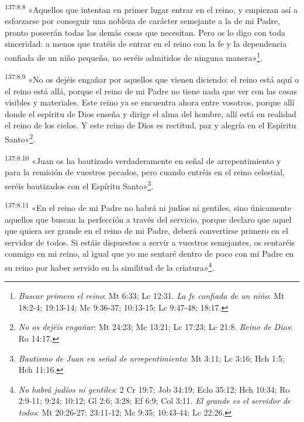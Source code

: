 \par
\textsuperscript{137:8.8} «Aquellos que intentan en primer lugar entrar en el reino, y empiezan así a esforzarse por conseguir una nobleza de carácter semejante a la de mi Padre, pronto poseerán todas las demás cosas que necesitan. Pero os lo digo con toda sinceridad: a menos que tratéis de entrar en el reino con la fe y la dependencia confiada de un niño pequeño, no seréis admitidos de ninguna manera»\footnote{\textit{Buscar primero el reino}: Mt 6:33; Lc 12:31. \textit{La fe confiada de un niño}: Mt 18:2-4; 19:13-14; Mc 9:36-37; 10:13-15; Lc 9:47-48; 18:17.}.

\par
\textsuperscript{137:8.9} «No os dejéis engañar por aquellos que vienen diciendo: el reino está aquí o el reino está allá, porque el reino de mi Padre no tiene nada que ver con las cosas visibles y materiales. Este reino ya se encuentra ahora entre vosotros, porque allí donde el espíritu de Dios enseña y dirige el alma del hombre, allí está en realidad el reino de los cielos. Y este reino de Dios es rectitud, paz y alegría en el Espíritu Santo»\footnote{\textit{No os dejéis engañar}: Mt 24:23; Mc 13:21; Lc 17:23; Lc 21:8. \textit{Reino de Dios}: Ro 14:17.}.

\par
\textsuperscript{137:8.10} «Juan os ha bautizado verdaderamente en señal de arrepentimiento y para la remisión de vuestros pecados, pero cuando entréis en el reino celestial, seréis bautizados con el Espíritu Santo»\footnote{\textit{Bautismo de Juan en señal de arrepentimiento}: Mt 3:11; Lc 3:16; Hch 1:5; Hch 11:16.}.

\par
\textsuperscript{137:8.11} «En el reino de mi Padre no habrá ni judíos ni gentiles, sino únicamente aquellos que buscan la perfección a través del servicio, porque declaro que aquel que quiera ser grande en el reino de mi Padre, deberá convertirse primero en el servidor de todos. Si estáis dispuestos a servir a vuestros semejantes, os sentaréis conmigo en mi reino, al igual que yo me sentaré dentro de poco con mi Padre en su reino por haber servido en la similitud de la criatura»\footnote{\textit{No habrá judíos ni gentiles}: 2 Cr 19:7; Job 34:19; Eclo 35:12; Hch 10:34; Ro 2:9-11; 9:24; 10:12; Gl 2:6; 3:28; Ef 6:9; Col 3:11. \textit{El grande es el servidor de todos}: Mt 20:26-27; 23:11-12; Mc 9:35; 10:43-44; Lc 22:26.}.

